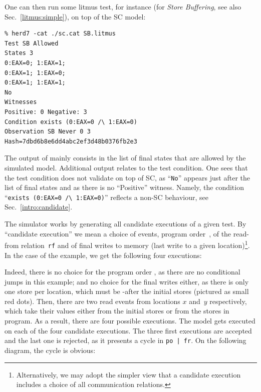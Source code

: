 One can then run some litmus test, for instance 
(for \emph{Store Buffering},
see also Sec.~\ref{litmus:simple}), on top of the SC model:
\begin{verbatim}
% herd7 -cat ./sc.cat SB.litmus
Test SB Allowed
States 3
0:EAX=0; 1:EAX=1;
0:EAX=1; 1:EAX=0;
0:EAX=1; 1:EAX=1;
No
Witnesses
Positive: 0 Negative: 3
Condition exists (0:EAX=0 /\ 1:EAX=0)
Observation SB Never 0 3
Hash=7dbd6b8e6dd4abc2ef3d48b0376fb2e3
\end{verbatim}
The output of \herd{} mainly consists in
the list of final states that are allowed by the simulated model.
Additional output relates to the test condition.
One sees that the test condition does not validate on top of SC,
as ``\texttt{No}'' appears just after the list of final states
and as there is no ``Positive'' witness.
Namely, the condition ``\verb+exists (0:EAX=0 /\ 1:EAX=0)+''
reflects a non-SC behaviour, see Sec.~\ref{intro:candidate}.

\label{intro:candidate}%
The simulator \herd{} works by generating all candidate executions
of a given test.
By ``candidate execution'' we mean a choice of events,
program order~, of the read-from relation~\texttt{rf}
and of final writes to memory
(last write to a given location)\footnote{Alternatively,
we may adopt the simpler view that
a candidate execution includes a choice of all communication relations.}.
In the case of the  example, we get the following four executions:
\begin{center}
\quad\quad
{}\quad\quad
{}\quad\quad
{}
\end{center}
Indeed, there is no choice for the program order , as there are no
conditional jumps in this example; and  no choice for the final
writes either, as there is only one store per location, which
must be -after the initial stores (pictured as small red dots).
Then, there are two read events from locations $x$ and~$y$ respectively,
which take their values either from the initial stores or from
the stores in program. As a result, there are four possible executions.
The model  gets executed on each of the four
candidate executions. The three first executions
are accepted and the last one is rejected, as it presents a cycle
in \texttt{po | fr}.
On the following diagram,
the cycle  is obvious:
\begin{center}\end{center}


